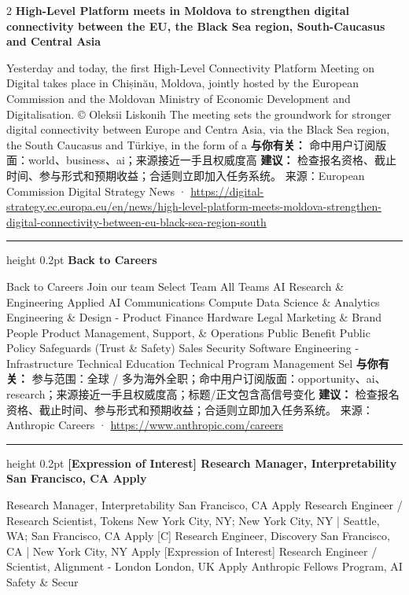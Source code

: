 \documentclass[10.5pt]{ctexart}
\begin{document}
\begin{multicols}{2}
{\large\bfseries High-Level Platform meets in Moldova to strengthen digital connectivity between the EU, the Black Sea region, South-Caucasus and Central Asia}\par
Yesterday and today, the first High-Level Connectivity Platform Meeting on Digital takes place in Chișinău, Moldova, jointly hosted by the European Commission and the Moldovan Ministry of Economic Development and Digitalisation. © Oleksii Liskonih The meeting sets the groundwork for stronger digital connectivity between Europe and Centra Asia, via the Black Sea region, the South Caucasus and Türkiye, in the form of a
\textbf{与你有关：} 命中用户订阅版面：world、business、ai；来源接近一手且权威度高
\textbf{建议：} 检查报名资格、截止时间、参与形式和预期收益；合适则立即加入任务系统。
{\footnotesize\color{ormuted} 来源：European Commission Digital Strategy News · \url{https://digital-strategy.ec.europa.eu/en/news/high-level-platform-meets-moldova-strengthen-digital-connectivity-between-eu-black-sea-region-south}}
\vspace{2mm}
\hrule height 0.2pt
\vspace{2mm}
{\large\bfseries Back to Careers}\par
Back to Careers Join our team Select Team All Teams AI Research \& Engineering Applied AI Communications Compute Data Science \& Analytics Engineering \& Design - Product Finance Hardware Legal Marketing \& Brand People Product Management, Support, \& Operations Public Benefit Public Policy Safeguards (Trust \& Safety) Sales Security Software Engineering - Infrastructure Technical Education Technical Program Management Sel
\textbf{与你有关：} 参与范围：全球 / 多为海外全职；命中用户订阅版面：opportunity、ai、research；来源接近一手且权威度高；标题/正文包含高信号变化
\textbf{建议：} 检查报名资格、截止时间、参与形式和预期收益；合适则立即加入任务系统。
{\footnotesize\color{ormuted} 来源：Anthropic Careers · \url{https://www.anthropic.com/careers}}
\vspace{2mm}
\hrule height 0.2pt
\vspace{2mm}
{\large\bfseries [Expression of Interest] Research Manager, Interpretability San Francisco, CA Apply}\par
[Expression of Interest] Research Manager, Interpretability San Francisco, CA Apply Research Engineer / Research Scientist, Tokens New York City, NY; New York City, NY | Seattle, WA; San Francisco, CA Apply [C] Research Engineer, Discovery San Francisco, CA | New York City, NY Apply [Expression of Interest] Research Engineer / Scientist, Alignment - London London, UK Apply Anthropic Fellows Program, AI Safety \& Secur

\end{multicols}
\end{document}
